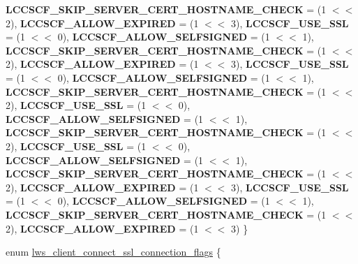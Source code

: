 \begin{DoxyCompactItemize}
{\bfseries L\+C\+C\+S\+C\+F\+\_\+\+S\+K\+I\+P\+\_\+\+S\+E\+R\+V\+E\+R\+\_\+\+C\+E\+R\+T\+\_\+\+H\+O\+S\+T\+N\+A\+M\+E\+\_\+\+C\+H\+E\+CK} = (1 $<$$<$ 2), 
{\bfseries L\+C\+C\+S\+C\+F\+\_\+\+A\+L\+L\+O\+W\+\_\+\+E\+X\+P\+I\+R\+ED} = (1 $<$$<$ 3), 
\newline
{\bfseries L\+C\+C\+S\+C\+F\+\_\+\+U\+S\+E\+\_\+\+S\+SL} = (1 $<$$<$ 0), 
{\bfseries L\+C\+C\+S\+C\+F\+\_\+\+A\+L\+L\+O\+W\+\_\+\+S\+E\+L\+F\+S\+I\+G\+N\+ED} = (1 $<$$<$ 1), 
{\bfseries L\+C\+C\+S\+C\+F\+\_\+\+S\+K\+I\+P\+\_\+\+S\+E\+R\+V\+E\+R\+\_\+\+C\+E\+R\+T\+\_\+\+H\+O\+S\+T\+N\+A\+M\+E\+\_\+\+C\+H\+E\+CK} = (1 $<$$<$ 2), 
{\bfseries L\+C\+C\+S\+C\+F\+\_\+\+A\+L\+L\+O\+W\+\_\+\+E\+X\+P\+I\+R\+ED} = (1 $<$$<$ 3), 
\newline
{\bfseries L\+C\+C\+S\+C\+F\+\_\+\+U\+S\+E\+\_\+\+S\+SL} = (1 $<$$<$ 0), 
{\bfseries L\+C\+C\+S\+C\+F\+\_\+\+A\+L\+L\+O\+W\+\_\+\+S\+E\+L\+F\+S\+I\+G\+N\+ED} = (1 $<$$<$ 1), 
{\bfseries L\+C\+C\+S\+C\+F\+\_\+\+S\+K\+I\+P\+\_\+\+S\+E\+R\+V\+E\+R\+\_\+\+C\+E\+R\+T\+\_\+\+H\+O\+S\+T\+N\+A\+M\+E\+\_\+\+C\+H\+E\+CK} = (1 $<$$<$ 2), 
{\bfseries L\+C\+C\+S\+C\+F\+\_\+\+U\+S\+E\+\_\+\+S\+SL} = (1 $<$$<$ 0), 
\newline
{\bfseries L\+C\+C\+S\+C\+F\+\_\+\+A\+L\+L\+O\+W\+\_\+\+S\+E\+L\+F\+S\+I\+G\+N\+ED} = (1 $<$$<$ 1), 
{\bfseries L\+C\+C\+S\+C\+F\+\_\+\+S\+K\+I\+P\+\_\+\+S\+E\+R\+V\+E\+R\+\_\+\+C\+E\+R\+T\+\_\+\+H\+O\+S\+T\+N\+A\+M\+E\+\_\+\+C\+H\+E\+CK} = (1 $<$$<$ 2), 
{\bfseries L\+C\+C\+S\+C\+F\+\_\+\+U\+S\+E\+\_\+\+S\+SL} = (1 $<$$<$ 0), 
{\bfseries L\+C\+C\+S\+C\+F\+\_\+\+A\+L\+L\+O\+W\+\_\+\+S\+E\+L\+F\+S\+I\+G\+N\+ED} = (1 $<$$<$ 1), 
\newline
{\bfseries L\+C\+C\+S\+C\+F\+\_\+\+S\+K\+I\+P\+\_\+\+S\+E\+R\+V\+E\+R\+\_\+\+C\+E\+R\+T\+\_\+\+H\+O\+S\+T\+N\+A\+M\+E\+\_\+\+C\+H\+E\+CK} = (1 $<$$<$ 2), 
{\bfseries L\+C\+C\+S\+C\+F\+\_\+\+A\+L\+L\+O\+W\+\_\+\+E\+X\+P\+I\+R\+ED} = (1 $<$$<$ 3), 
{\bfseries L\+C\+C\+S\+C\+F\+\_\+\+U\+S\+E\+\_\+\+S\+SL} = (1 $<$$<$ 0), 
{\bfseries L\+C\+C\+S\+C\+F\+\_\+\+A\+L\+L\+O\+W\+\_\+\+S\+E\+L\+F\+S\+I\+G\+N\+ED} = (1 $<$$<$ 1), 
\newline
{\bfseries L\+C\+C\+S\+C\+F\+\_\+\+S\+K\+I\+P\+\_\+\+S\+E\+R\+V\+E\+R\+\_\+\+C\+E\+R\+T\+\_\+\+H\+O\+S\+T\+N\+A\+M\+E\+\_\+\+C\+H\+E\+CK} = (1 $<$$<$ 2), 
{\bfseries L\+C\+C\+S\+C\+F\+\_\+\+A\+L\+L\+O\+W\+\_\+\+E\+X\+P\+I\+R\+ED} = (1 $<$$<$ 3)
 \}
\item 
enum \hyperlink{group__client_ga96f3dbad54b2853969cfa933d66871ce}{lws\+\_\+client\+\_\+connect\+\_\+ssl\+\_\+connection\+\_\+flags} \{ \newline

\end{DoxyCompactItemize}
